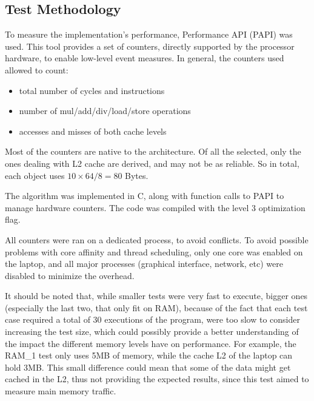 \documentclass[twocolumn,10pt]{scrartcl}
\begin{document}
\subsection{Test Methodology}

To measure the implementation's performance, Performance API (PAPI) was used. This tool provides a set of counters, directly supported by the processor hardware, to enable low-level event measures. In general, the counters used allowed to count:
\begin{itemize}
	\item total number of cycles and instructions
	\item number of mul/add/div/load/store operations
	\item accesses and misses of both cache levels
\end{itemize}

Most of the counters are native to the architecture. Of all the selected, only the ones dealing with L2 cache are derived, and may not be as reliable. So in total, each object uses $10 \times 64 / 8 = 80$ Bytes.

The algorithm was implemented in C, along with function calls to PAPI to manage hardware counters. The code was compiled with the level 3 optimization flag.

All counters were ran on a dedicated process, to avoid conflicts. To avoid possible problems with core affinity and thread scheduling, only one core was enabled on the laptop, and all major processes (graphical interface, network, etc) were disabled to minimize the overhead.

It should be noted that, while smaller tests were very fast to execute, bigger ones (especially the last two, that only fit on RAM), because of the fact that each test case required a total of 30 executions of the program, were too slow to consider increasing the test size, which could possibly provide a better understanding of the impact the different memory levels have on performance. For example, the RAM\_1 test only uses 5MB of memory, while the cache L2 of the laptop can hold 3MB. This small difference could mean that some of the data might get cached in the L2, thus not providing the expected results, since this test aimed to measure main memory traffic.


\end{document}
